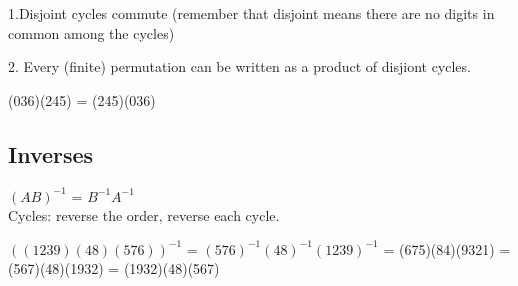 \begin{proposition} 1.Disjoint cycles commute (remember that disjoint means there are no digits in common among the cycles) \par 2. Every (finite) permutation can be written as a product of disjiont cycles. \end{proposition} 

\begin{example} (036)(245) = (245)(036) \end{example}

\subsection{Inverses}  $(AB)^{-1}$ = $B^{-1}A^{-1}$ \\  Cycles: reverse the order, reverse each cycle. \begin{example} $((1239)(48)(576))^{-1}$ = $(576)^{-1}(48)^{-1}(1239)^{-1}$ = (675)(84)(9321) = (567)(48)(1932) = (1932)(48)(567) \end{example}

